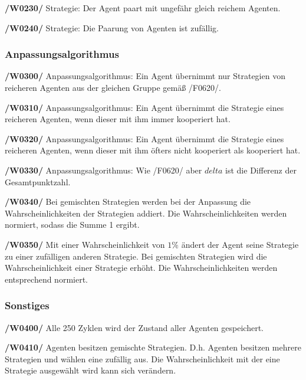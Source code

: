 \textbf{/W0230/}
Strategie: Der Agent paart mit ungefähr gleich reichem Agenten.

\textbf{/W0240/}
Strategie: Die Paarung von Agenten ist zufällig.

\subsubsection{Anpassungsalgorithmus}

\textbf{/W0300/}
Anpassungsalgorithmus: Ein Agent übernimmt nur Strategien von reicheren Agenten aus der gleichen Gruppe gemäß /F0620/.

\textbf{/W0310/}
Anpassungsalgorithmus: Ein Agent übernimmt die Strategie eines reicheren Agenten, wenn dieser mit ihm immer kooperiert hat.

\textbf{/W0320/}
Anpassungsalgorithmus: Ein Agent übernimmt die Strategie eines reicheren Agenten, wenn dieser mit ihm öfters nicht kooperiert als kooperiert hat.

\textbf{/W0330/}
Anpassungsalgorithmus: Wie /F0620/ aber $delta$ ist die Differenz der Gesamtpunktzahl.

\textbf{/W0340/}
Bei gemischten Strategien werden bei der Anpassung die Wahrscheinlichkeiten der Strategien addiert. Die Wahrscheinlichkeiten werden normiert, sodass die Summe 1 ergibt.

\textbf{/W0350/}
Mit einer Wahrscheinlichkeit von $1\%$ ändert der Agent seine Strategie zu einer zufälligen anderen Strategie. Bei gemischten Strategien wird die Wahrscheinlichkeit einer Strategie erhöht. Die Wahrscheinlichkeiten werden entsprechend normiert.

\subsubsection{Sonstiges}

\textbf{/W0400/}
Alle 250 Zyklen wird der Zustand aller Agenten gespeichert.

\textbf{/W0410/}
Agenten besitzen gemischte Strategien. D.h. Agenten besitzen mehrere Strategien und wählen eine zufällig aus. Die Wahrscheinlichkeit mit der eine Strategie ausgewählt wird kann sich verändern.